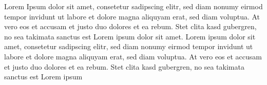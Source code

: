 \documentclass[12pt]{doctoral_thesis_uniwue}
\begin{document}


\newpage



\setcounter{page}{1} %




\newpage



Lorem Ipsum dolor sit amet, consetetur sadipscing elitr, sed diam nonumy
eirmod tempor invidunt ut labore et dolore magna aliquyam erat, sed diam
voluptua. At vero eos et accusam et justo duo dolores et ea rebum. Stet
clita kasd gubergren, no sea takimata sanctus est Lorem ipsum dolor sit
amet. Lorem ipsum dolor sit amet, consetetur sadipscing elitr, sed diam
nonumy eirmod tempor invidunt ut labore et dolore magna aliquyam erat,
sed diam voluptua. At vero eos et accusam et justo duo dolores et ea
rebum. Stet clita kasd gubergren, no sea takimata sanctus est Lorem
ipsum

\newpage



\begin{spacing}{0.01}
    \footnotesize \tableofcontents
\end{spacing}

\newpage


\setcounter{page}{1} %
\end{document}
